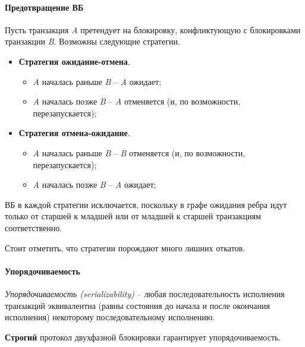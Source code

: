 \paragraph{Предотвращение ВБ}

Пусть транзакция \textit{A} претендует на блокировку, конфликтующую с блокировками транзакции
\textit{B}. Возможны следующие стратегии.

\begin{itemize}
    \item \textbf{Стратегия ожидание-отмена}.
        \begin{itemize}
            \item \textit{A} началась раньше \textit{B} -- \textit{A} ожидает;
            \item \textit{A} началась позже \textit{B} -- \textit{A} отменяется (и, по
                возможности, перезапускается);
        \end{itemize}
    \item \textbf{Стратегия отмена-ожидание}.
        \begin{itemize}
            \item \textit{A} началась раньше \textit{B} -- \textit{B} отменяется (и, по
                возможности, перезапускается);
            \item \textit{A} началась позже \textit{B} -- \textit{A} ожидает;
        \end{itemize}
\end{itemize}

ВБ в каждой стратегии исключается, поскольку в графе ожидания ребра идут только от старшей к
младшей или от младшей к старшей транзакциям соответственно.

Стоит отметить, что стратегии порождают много лишних откатов.

\paragraph{Упорядочиваемость}

\begin{definition}
    \textit{Упорядочиваемость (serializability)} -- любая последовательность исполнения транзакций эквивалентна
    (равны состояния до начала и после окончания исполнения) некоторому последовательному
    исполнению.
\end{definition}

\begin{proposition}
    \textbf{Строгий} протокол двухфазной блокировки гарантирует упорядочиваемость.
\end{proposition}

